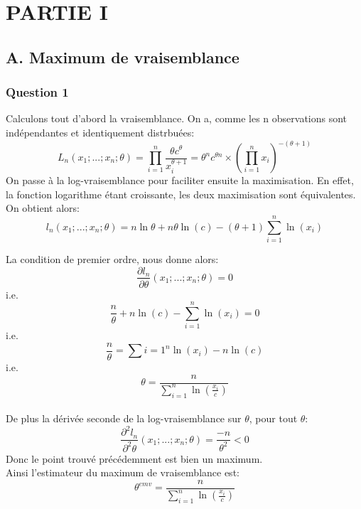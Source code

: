 \documentclass[a4paper,11pt]{article}
\theoremstyle{remark}
\begin{document}
\section*{PARTIE I}
\subsection*{A. Maximum de vraisemblance}
\subsubsection*{Question 1}
Calculons tout d'abord la vraisemblance. On a, comme les n observations sont ind\'ependantes et identiquement distrbu\'ees:\\
$$L_{n}(x_{1};...;x_{n};\theta)= \prod_{i=1}^{n} \frac{\theta c^{\theta}}{x_{i}^{\theta +1}} = \theta^{n}c^{\theta n}\times ( \prod_{i=1}^{n} x_{i})^{-(\theta +1)}$$
On passe \`a la log-vraisemblance pour faciliter ensuite la maximisation. En effet, la fonction logarithme \'etant croissante, les deux maximisation sont \'equivalentes. On obtient alors:
$$l_{n}(x_{1};...;x_{n};\theta)= n\ln\theta + n\theta\ln(c)-(\theta+1)\sum_{i=1}^{n}\ln(x_{i})$$

La condition de premier ordre, nous donne alors:
$$\frac{\partial l_{n}}{\partial \theta}(x_{1};...;x_{n};\theta)=0 $$
i.e. $$\frac{n}{\theta} + n\ln(c) - \sum_{i=1}^{n}\ln(x_{i})=0$$
i.e.$$ \frac{n}{\theta}= \sum{i=1}^{n}\ln(x_{i})-n\ln(c)$$
i.e.$$\theta = \frac{n}{\sum_{i=1}^{n}\ln(\frac{x_{i}}{c})}$$
\\
De plus la d\'eriv\'ee seconde de la log-vraisemblance sur $\theta$, pour tout $\theta$:
$$\frac{\partial^{2} l_{n}}{\partial^{2} \theta}(x_{1};...;x_{n};\theta)=\frac{-n}{\theta^{2}} <0 $$
Donc le point trouv\'e pr\'ec\'edemment est bien un maximum.\\

Ainsi l'estimateur du maximum de vraisemblance est:
$$\theta^{emv}=\frac{n}{\sum_{i=1}^{n}\ln(\frac{x_{i}}{c})}$$
\end{document}
